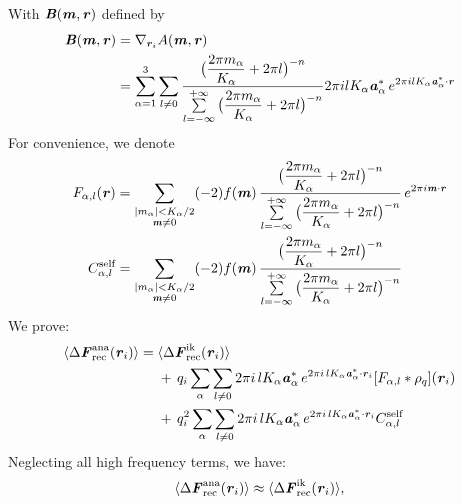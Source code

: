 \documentclass[aps,pre,preprint]{revtex4}
\renewcommand{\v}[1]{\textbf{\textit{#1}}}
\begin{document}
With $\v B(\v m, \v r)$ defined by
\begin{align}\nonumber
  \v B(\v m, \v r)
  &=
  \nabla_{\v r_i}A(\v m, \v r)\\
  &=
  \sum_{\alpha=1}^3\sum_{l\neq 0}
  \frac
  {\big(\dfrac{2\pi m_\alpha}{K_\alpha} + 2\pi l\big)^{-n}}
  {\sum\limits_{l=-\infty}^{+\infty}
    \big(\dfrac{2\pi m_\alpha}{K_\alpha} + 2\pi l\big)^{-n}}
  2\pi i l K_\alpha\v a_\alpha^\ast\,e^{2\pi i l K_\alpha\v a^\ast_\alpha\cdot \v r} 
\end{align}
For convenience, we denote
\begin{align}
  F_{\alpha,l} (\v r)
  &=
  \sum_{
    \begin{subarray}{c}
      \vert m_{\alpha}\vert < K_\alpha/2\\
      \v m\neq 0
    \end{subarray}}
  (-2)f(\v m)\,
  \frac
  {\big(\dfrac{2\pi m_\alpha}{K_\alpha} + 2\pi l\big)^{-n}}
  {\sum\limits_{l=-\infty}^{+\infty}
    \big(\dfrac{2\pi m_\alpha}{K_\alpha} + 2\pi l\big)^{-n}}\,
  e^{2\pi i\v m\cdot \v r}\\
  C_{\alpha,l}^{\textrm{self}}
  &= 
  \sum_{
    \begin{subarray}{c}
      \vert m_{\alpha}\vert < K_\alpha/2\\
      \v m\neq 0
    \end{subarray}}
  (-2)f(\v m)\,
  \frac
  {\big(\dfrac{2\pi m_\alpha}{K_\alpha} + 2\pi l\big)^{-n}}
  {\sum\limits_{l=-\infty}^{+\infty}
    \big(\dfrac{2\pi m_\alpha}{K_\alpha} + 2\pi l\big)^{-n}}\,
\end{align}
We prove:
\begin{align} \nonumber
  \langle \Delta\v F_{\textrm{rec}}^{\textrm{ana}}(\v r_i)\rangle
  =\;&
  \langle \Delta\v F_{\textrm{rec}}^{\textrm{ik}}(\v r_i)\rangle\\\nonumber
  &+\,
  q_i\sum_{\alpha}\sum_{l\neq 0}
  2\pi i\,l K_\alpha\v a_\alpha^\ast\,e^{2\pi i\,l K_\alpha\v a^\ast_\alpha\cdot \v r_i}
  [F_{\alpha,l}\ast\rho_q](\v r_i) \\\label{eqn:tmp30}
  &+\,
  q^2_i\sum_{\alpha}\sum_{l\neq 0}
  2\pi i\,l K_\alpha\v a_\alpha^\ast\,e^{2\pi i\,l K_\alpha\v a^\ast_\alpha\cdot \v r_i}
  C_{\alpha,l}^{\textrm{self}}
\end{align}
Neglecting all high frequency terms, we have:
\begin{align}\label{eqn:tmp31}
  \langle \Delta\v F_{\textrm{rec}}^{\textrm{ana}}(\v r_i)\rangle
  \approx
  \langle \Delta\v F_{\textrm{rec}}^{\textrm{ik}}(\v r_i)\rangle,
\end{align}
\end{document}
